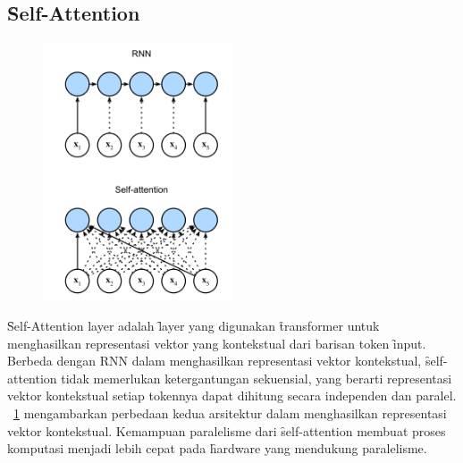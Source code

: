 	\subsection{\f{Self-Attention}}
	\begin{figure}[!ht]
		\centering
		\includegraphics[width=0.5\textwidth]{assets/pics/rnn-compare-selfattention.png}
		\label{fig:self-attention-rnn}
	\end{figure}

	\f{Self-Attention layer} adalah \f{layer} yang digunakan \f{transformer} untuk menghasilkan representasi vektor yang kontekstual dari barisan token \f{input}. Berbeda dengan RNN dalam menghasilkan representasi vektor kontekstual, \f{self-attention} tidak memerlukan ketergantungan sekuensial, yang berarti representasi vektor kontekstual setiap tokennya dapat dihitung secara independen dan paralel. \pic~\ref{fig:self-attention-rnn} mengambarkan perbedaan kedua arsitektur dalam menghasilkan representasi vektor kontekstual. Kemampuan paralelisme dari \f{self-attention} membuat proses komputasi menjadi lebih cepat pada \f{hardware} yang mendukung paralelisme. 

